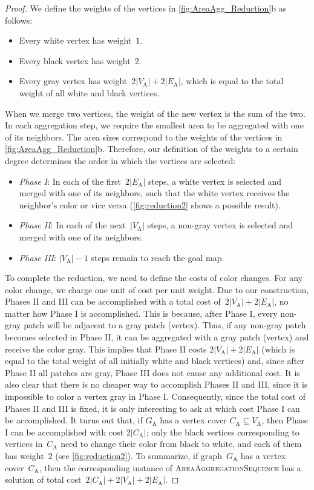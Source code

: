 \begin{proof}
We define the weights of the vertices 
in \fig\ref{fig:AreaAgg_Reduction}b as follows:
\begin{itemize}
\item Every white vertex has weight~$1$.
\item Every black vertex has weight~$2$.
\item Every gray vertex has weight~$2|V_\mathrm{A}| + 2|E_\mathrm{A}|$,
which is equal to the total weight of all white and black vertices.
\end{itemize}
When we merge two vertices, 
the weight of the new vertex is the sum of the two.
In each aggregation step, 
we require the smallest area to be aggregated with one of its neighbors.
The area sizes correspond to the weights of the vertices in \fig\ref{fig:AreaAgg_Reduction}b.   
Therefore, our definition of the weights to a certain degree determines 
the order in which the vertices are selected:
\begin{itemize}
\item \emph{Phase I}: In each of the first~$2|E_\mathrm{A}|$ steps, 
a white vertex is selected and merged with one of its neighbors, 
such that the white vertex receives the neighbor's color or vice versa
(\fig\ref{fig:reduction2} shows a possible result).
\item \emph{Phase II}: In each of the next~$|V_\mathrm{A}|$ steps, 
a non-gray vertex is selected and merged with one of its neighbors.
\item \emph{Phase III}: $|V_\mathrm{A}|-1$ steps remain to reach the goal map.
\end{itemize}

To complete the reduction, 
we need to define the costs of color changes. 
For any color change, 
we charge one unit of cost per unit weight.
Due to our construction, Phases II and III can be accomplished with
a total cost of~$2|V_\mathrm{A}|+2|E_\mathrm{A}|$, 
no matter how Phase I is accomplished.
This is because, after Phase I, 
every non-gray patch will be adjacent to a gray patch (vertex).
Thus, if any non-gray patch becomes selected in Phase II, 
it can be aggregated with a gray patch (vertex) and 
receive the color gray. 
This implies that Phase II costs $2|V_\mathrm{A}|+2|E_\mathrm{A}|$ 
(which is equal to the total weight of 
all initially white and black vertices) and, 
since after Phase II all patches are gray, 
Phase III does not cause any additional cost.  
It is also clear that 
there is no cheaper way to accomplish Phases II and III,
since it is impossible to color a vertex gray in Phase I.
Consequently, since the total cost of Phases II and III is fixed, 
it is only interesting to ask 
at which cost Phase I can be accomplished.
It turns out that, if $G_\mathrm{A}$ 
has a vertex cover $C_\mathrm{A} \subseteq V_\mathrm{A}$, 
then Phase I can be accomplished with cost $2|C_\mathrm{A}|$;
only the black vertices corresponding to vertices in~$C_\mathrm{A}$ 
need to change their color from black to white, and 
each of them has weight~$2$ (see \fig\ref{fig:reduction2}).
To summarize, if graph~$G_\mathrm{A}$ has a vertex cover~$C_\mathrm{A}$, 
then the corresponding instance of \textsc{AreaAggregationSequence} 
has a solution of 
total cost~$2|C_\mathrm{A}|+2|V_\mathrm{A}|+2|E_\mathrm{A}|$.


\end{proof}
